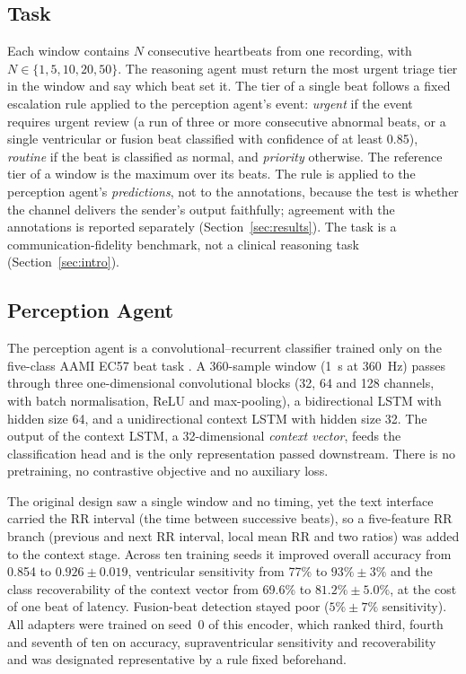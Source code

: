 \subsection{Task}
Each window contains $N$ consecutive heartbeats from one recording, with $N \in \{1,5,10,20,50\}$. The reasoning agent must return the most urgent triage tier in the window and say which beat set it. The tier of a single beat follows a fixed escalation rule applied to the perception agent's event: \emph{urgent} if the event requires urgent review (a run of three or more consecutive abnormal beats, or a single ventricular or fusion beat classified with confidence of at least 0.85), \emph{routine} if the beat is classified as normal, and \emph{priority} otherwise. The reference tier of a window is the maximum over its beats. The rule is applied to the perception agent's \emph{predictions}, not to the annotations, because the test is whether the channel delivers the sender's output faithfully; agreement with the annotations is reported separately (Section~\ref{sec:results}). The task is a communication-fidelity benchmark, not a clinical reasoning task (Section~\ref{sec:intro}).

\subsection{Perception Agent}
The perception agent is a convolutional--recurrent classifier trained only on the five-class AAMI EC57 beat task \cite{aami1998ec57}. A 360-sample window (1~s at 360~Hz) passes through three one-dimensional convolutional blocks (32, 64 and 128 channels, with batch normalisation, ReLU and max-pooling), a bidirectional LSTM with hidden size 64, and a unidirectional context LSTM with hidden size 32. The output of the context LSTM, a 32-dimensional \emph{context vector}, feeds the classification head and is the only representation passed downstream. There is no pretraining, no contrastive objective and no auxiliary loss.

The original design saw a single window and no timing, yet the text interface carried the RR interval (the time between successive beats), so a five-feature RR branch (previous and next RR interval, local mean RR and two ratios) was added to the context stage. Across ten training seeds it improved overall accuracy from 0.854 to $0.926 \pm 0.019$, ventricular sensitivity from 77\% to $93\% \pm 3\%$ and the class recoverability of the context vector from 69.6\% to $81.2\% \pm 5.0\%$, at the cost of one beat of latency. Fusion-beat detection stayed poor ($5\% \pm 7\%$ sensitivity). All adapters were trained on seed~0 of this encoder, which ranked third, fourth and seventh of ten on accuracy, supraventricular sensitivity and recoverability and was designated representative by a rule fixed beforehand.

